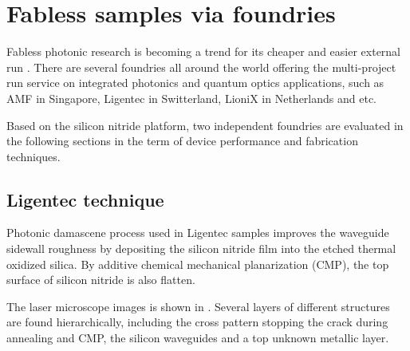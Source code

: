 \section{Fabless samples via foundries}

Fabless photonic research is becoming a trend for its cheaper and easier external run \cite{Hochberg2010}. There are several foundries all around the world offering the multi-project run service on integrated photonics and quantum optics applications, such as AMF in Singapore, Ligentec in Switterland, LioniX in Netherlands and etc. 

Based on the silicon nitride platform, two independent foundries are evaluated in the following sections in the term of device performance and fabrication techniques.

\subsection{Ligentec technique}
Photonic damascene process \cite{Pfeiffer2015a,Pfeiffer2018a} used in Ligentec samples improves the waveguide sidewall roughness by depositing the silicon nitride film into the etched thermal oxidized silica. By additive chemical mechanical planarization (CMP), the top surface of silicon nitride is also flatten.  

The laser microscope images is shown in . Several layers of different structures are found hierarchically, including the cross pattern stopping the crack during annealing and CMP, the silicon waveguides and a top unknown metallic layer.


